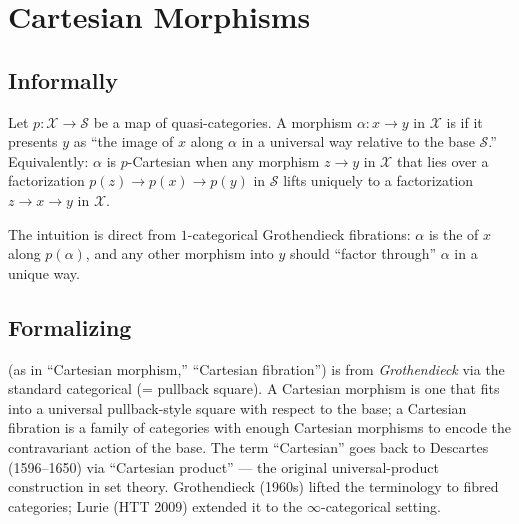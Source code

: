 \section{Cartesian Morphisms}
\label{sec:cartesian-morphisms}

\subsection{Informally}

Let $p : \mathcal{X} \to \mathcal{S}$ be a map of quasi-categories. A
morphism $\alpha : x \to y$ in $\mathcal{X}$ is  if
it presents $y$ as ``the image of $x$ along $\alpha$ in a universal way
relative to the base $\mathcal{S}$.'' Equivalently: $\alpha$ is
$p$-Cartesian when any morphism $z \to y$ in $\mathcal{X}$ that lies over
a factorization $p(z) \to p(x) \to p(y)$ in $\mathcal{S}$ lifts uniquely
to a factorization $z \to x \to y$ in $\mathcal{X}$.

The intuition is direct from $1$-categorical Grothendieck fibrations:
$\alpha$ is the  of $x$ along $p(\alpha)$, and any other
morphism into $y$ should ``factor through'' $\alpha$ in a unique way.

\subsection{Formalizing}

\begin{nameorigin}
 (as in ``Cartesian morphism,'' ``Cartesian fibration'')
is from \emph{Grothendieck} via the standard categorical
 (= pullback square). A Cartesian morphism is
one that fits into a universal pullback-style square with respect to
the base; a Cartesian fibration is a family of categories with enough
Cartesian morphisms to encode the contravariant action of the base.
The term ``Cartesian'' goes back to Descartes (1596--1650) via
``Cartesian product'' — the original universal-product construction
in set theory. Grothendieck (1960s) lifted the terminology to fibred
categories; Lurie (HTT 2009) extended it to the $\infty$-categorical
setting.
\end{nameorigin}

